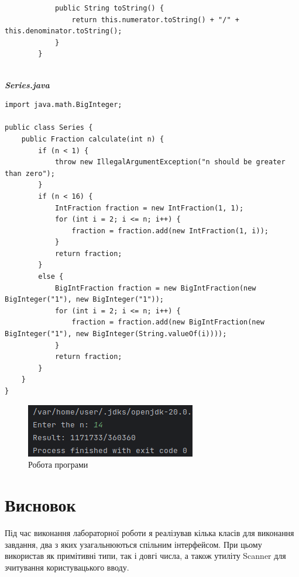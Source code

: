 \documentclass[14pt]{extreport}
\begin{document}
\begin{normalsize}
\begin{lstlisting}
			public String toString() {
				return this.numerator.toString() + "/" + this.denominator.toString();
			}
		}
		
	\end{lstlisting}	
	
	
	\textbf{\textit{Series.java}}
	\begin{lstlisting}
import java.math.BigInteger;

public class Series {
	public Fraction calculate(int n) {
		if (n < 1) {
			throw new IllegalArgumentException("n should be greater than zero");
		}
		if (n < 16) {
			IntFraction fraction = new IntFraction(1, 1);
			for (int i = 2; i <= n; i++) {
				fraction = fraction.add(new IntFraction(1, i));
			}
			return fraction;
		}
		else {
			BigIntFraction fraction = new BigIntFraction(new BigInteger("1"), new BigInteger("1"));
			for (int i = 2; i <= n; i++) {
				fraction = fraction.add(new BigIntFraction(new BigInteger("1"), new BigInteger(String.valueOf(i))));
			}
			return fraction;
		}
	}
}

	\end{lstlisting}	
	
	\begin{figure}[H]
		\centering
		\includegraphics[scale=1]{1}
		\caption{Робота програми}
	\end{figure}

	\section*{Висновок}
	Під час виконання лабораторної роботи я реалізував кілька класів для виконання завдання, два з яких узагальнюються спільним інтерфейсом. При цьому використав як примітивні типи, так і довгі числа, а також утиліту Scanner для зчитування користувацького вводу.
	 
\end{normalsize}
\end{document}

